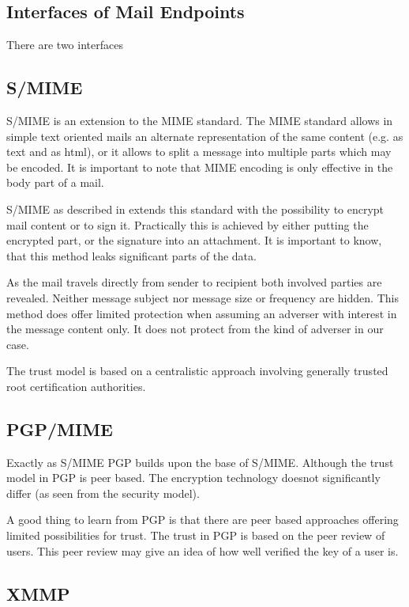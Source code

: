 \subsection{Interfaces of Mail Endpoints}
There are two interfaces 


\subsection{S/MIME}
S/MIME is an extension to the MIME standard. The MIME standard allows in simple text oriented mails an alternate representation of the same content (e.g. as text and as html), or it allows to split a message into multiple parts which may be encoded. It is important to note that MIME encoding is only effective in the body part of a mail.

S/MIME as described in \cite{RFC3851} extends this standard with the possibility to encrypt mail content or to sign it. Practically this is achieved by either putting the encrypted part, or the signature into an attachment. It is important to know, that this method leaks significant parts of the data.

As the mail travels directly from sender to recipient both involved parties are revealed. Neither message subject nor message size or frequency are hidden. This method does offer limited protection when assuming an adverser with interest in the message content only. It does not protect from the kind of adverser in our case. 

The trust model is based on a centralistic approach involving generally trusted root certification authorities.

\subsection{PGP/MIME}
Exactly as S/MIME PGP\cite{RFC2440} builds upon the base of S/MIME. Although the trust model in PGP is peer based. The encryption technology doesnot significantly differ (as seen from the security model).

A good thing to learn from PGP is that there are peer based approaches offering limited possibilities for trust. The trust in PGP is based on the peer review of users. This peer review may give an idea of how well verified the key of a user is.


\subsection{XMMP}

